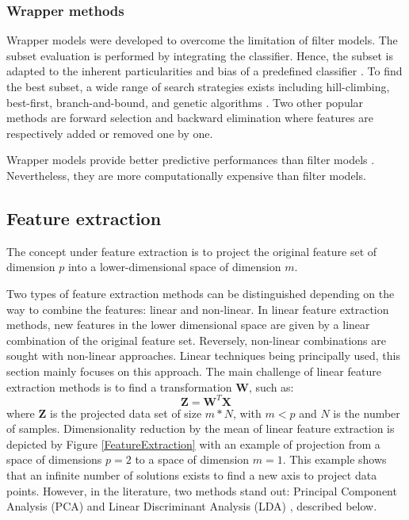 \documentclass[a4paper,10pt]{article}
\begin{document}
\subsubsection{Wrapper methods}

Wrapper models were developed to overcome the limitation of filter models. The subset evaluation is performed by integrating the classifier. Hence, the subset is adapted to the inherent particularities and bias of a predefined classifier \cite{tang2014feature}.
To find the best subset, a wide range of search strategies exists including hill-climbing, best-first, branch-and-bound, and genetic algorithms \cite{guyon2003introduction}. Two other popular methods are forward selection and backward elimination where features are respectively added or removed one by one.

Wrapper models provide better predictive performances than filter models \cite{kohavi1997wrappers}. Nevertheless, they are more computationally expensive than filter models.

\subsection{Feature extraction}
The concept under feature extraction is to project the original feature set of dimension $p$ into a lower-dimensional space of dimension $m$.

Two types of feature extraction methods can be distinguished depending on the way to combine the features: linear and non-linear. In linear feature extraction methods, new features in the lower dimensional space are given by a linear combination of the original feature set. Reversely, non-linear combinations are sought with non-linear approaches. 
Linear techniques being principally used, this section mainly focuses on this approach.
The main challenge of linear feature extraction methods is to find a transformation $\bm{W}$, such as:
\begin{equation}
\bm{Z} =  \bm{W}^T \bm{X}
\end{equation}
where $\bm{Z}$ is the projected data set of size $m * N$, with $m < p$ and $N$ is the number of samples.
Dimensionality reduction by the mean of linear feature extraction is depicted by Figure \ref{FeatureExtraction} with an example of projection from a space of dimensions $p = 2$ to a space of dimension $m=1$. This example shows that an infinite number of solutions exists to find a new axis to project data points. However, in the literature, two methods stand out: Principal Component Analysis (PCA) and Linear Discriminant Analysis (LDA) \cite{tang2014feature}, described below. 
\end{document}
